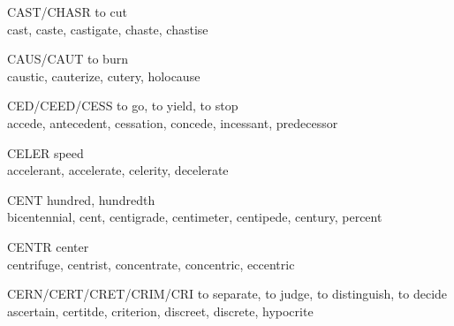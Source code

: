 \begin{flashcard}[Roots]{CAST/CHASR}
to cut\\
\vspace{0.2in}
cast, caste, castigate, chaste, chastise\\
\end{flashcard}

\begin{flashcard}[Roots]{CAUS/CAUT}
 to burn\\
\vspace{0.2in}
caustic, cauterize, cutery, holocause\\
\end{flashcard}

\begin{flashcard}[Roots]{CED/CEED/CESS}
 to go, to yield, to stop\\
\vspace{0.2in}
accede, antecedent, cessation, concede, incessant, predecessor\\
\end{flashcard}

\begin{flashcard}[Roots]{CELER}
 speed\\
\vspace{0.2in}
 accelerant, accelerate, celerity, decelerate\\
\end{flashcard}

\begin{flashcard}[Roots]{CENT}
hundred, hundredth\\
\vspace{0.2in}
 bicentennial, cent, centigrade, centimeter, centipede, century, percent\\
\end{flashcard}

\begin{flashcard}[Roots]{CENTR}
 center\\
\vspace{0.2in}
centrifuge, centrist, concentrate, concentric, eccentric\\
\end{flashcard}

\begin{flashcard}[Roots]{CERN/CERT/CRET/CRIM/CRI}
to separate, to judge, to distinguish, to decide\\
\vspace{0.2in}
 ascertain, certitde, criterion, discreet, discrete, hypocrite\\
\end{flashcard}

